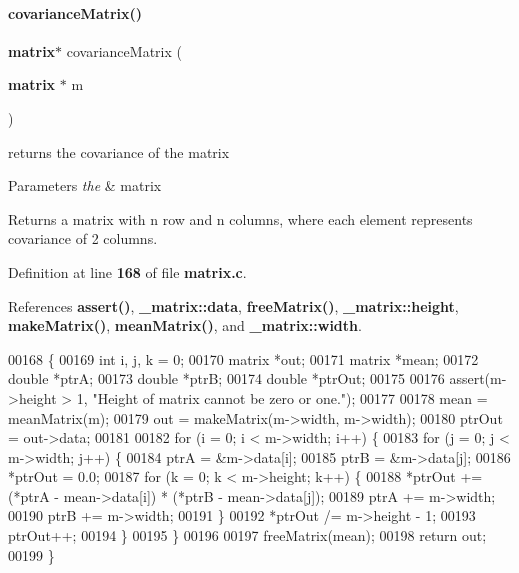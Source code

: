 \paragraph{covariance\+Matrix()}
{\footnotesize\ttfamily \textbf{ matrix}$\ast$ covariance\+Matrix (\begin{DoxyParamCaption}\item[{\textbf{ matrix} $\ast$}]{m }\end{DoxyParamCaption})}



returns the covariance of the matrix 


\begin{DoxyParams}{Parameters}
{\em the} & matrix \\
\hline
\end{DoxyParams}
\begin{DoxyReturn}{Returns}
a matrix with n row and n columns, where each element represents covariance of 2 columns. 
\end{DoxyReturn}


Definition at line \textbf{ 168} of file \textbf{ matrix.\+c}.



References \textbf{ assert()}, \textbf{ \+\_\+matrix\+::data}, \textbf{ free\+Matrix()}, \textbf{ \+\_\+matrix\+::height}, \textbf{ make\+Matrix()}, \textbf{ mean\+Matrix()}, and \textbf{ \+\_\+matrix\+::width}.


\begin{DoxyCode}
00168                                     \{
00169   \textcolor{keywordtype}{int} i, j, k = 0;
00170   matrix *out;
00171   matrix *mean;
00172   \textcolor{keywordtype}{double} *ptrA;
00173   \textcolor{keywordtype}{double} *ptrB;
00174   \textcolor{keywordtype}{double} *ptrOut;
00175 
00176   assert(m->height > 1, \textcolor{stringliteral}{"Height of matrix cannot be zero or one."});
00177 
00178   mean = meanMatrix(m);
00179   out = makeMatrix(m->width, m->width);
00180   ptrOut = out->data;
00181 
00182   \textcolor{keywordflow}{for} (i = 0; i < m->width; i++) \{
00183     \textcolor{keywordflow}{for} (j = 0; j < m->width; j++) \{
00184       ptrA = &m->data[i];
00185       ptrB = &m->data[j];
00186       *ptrOut = 0.0;
00187       \textcolor{keywordflow}{for} (k = 0; k < m->height; k++) \{
00188         *ptrOut += (*ptrA - mean->data[i]) * (*ptrB - mean->data[j]);
00189         ptrA += m->width;
00190         ptrB += m->width;
00191       \}
00192       *ptrOut /= m->height - 1;
00193       ptrOut++;
00194     \}
00195   \}
00196 
00197   freeMatrix(mean);
00198   \textcolor{keywordflow}{return} out;
00199 \}
\end{DoxyCode}
\mbox{\label{a00041_af49b525d7476c365833db9acd975e3a5}} 
